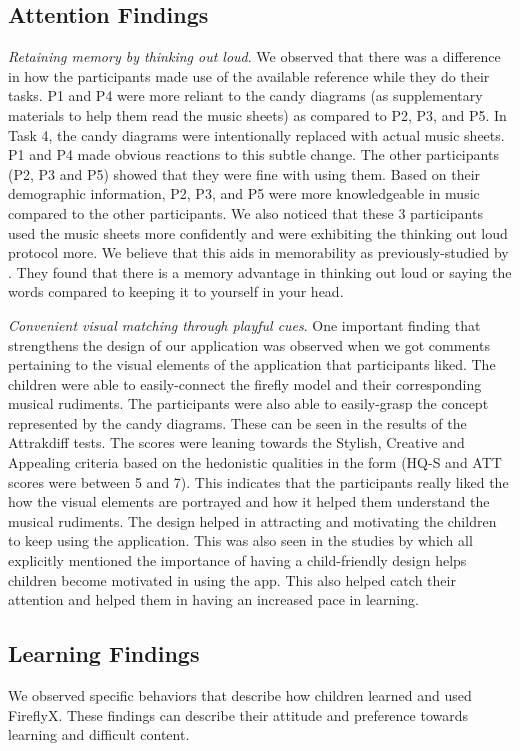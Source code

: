 \subsection{Attention Findings}
\textit{Retaining memory by thinking out loud}. We observed that there was a difference in how the participants made use of the available reference while they do their tasks. P1 and P4 were more reliant to the candy diagrams (as supplementary materials to help them read the music sheets) as compared to P2, P3, and P5. In Task 4, the candy diagrams were intentionally replaced with actual music sheets. P1 and P4 made obvious reactions to this subtle change. The other participants (P2, P3 and P5) showed that they were fine with using them. Based on their demographic information, P2, P3, and P5 were more knowledgeable in music compared to the other participants. We also noticed that these 3 participants used the music sheets more confidently and were exhibiting the thinking out loud protocol more. We believe that this aids in memorability as previously-studied by . They found that there is a memory advantage in thinking out loud or saying the words compared to keeping it to yourself in your head. 

\textit{Convenient visual matching through playful cues}. One important finding that strengthens the design of our application was observed when we got comments pertaining to the visual elements of the application that participants liked. The children were able to easily-connect the firefly model and their corresponding musical rudiments. The participants were also able to easily-grasp the concept represented by the candy diagrams. These can be seen in the results of the Attrakdiff tests.  The scores were leaning towards the Stylish, Creative and Appealing criteria based on the hedonistic qualities in the form (HQ-S and ATT scores were between 5 and 7). This indicates that the participants really liked the how the visual elements are portrayed and how it helped them understand the musical rudiments. The design helped in attracting and motivating the children to keep using the application. This was also seen in the studies by \cite{cohen2011young,burton2016music,chung2017designing} which all explicitly mentioned the importance of having a child-friendly design helps children become motivated in using the app. This also helped catch their attention and helped them in having an increased pace in learning. 

\subsection{Learning Findings}
We observed specific behaviors that describe how children learned and used FireflyX. These findings can describe their attitude and preference towards learning and difficult content. 

